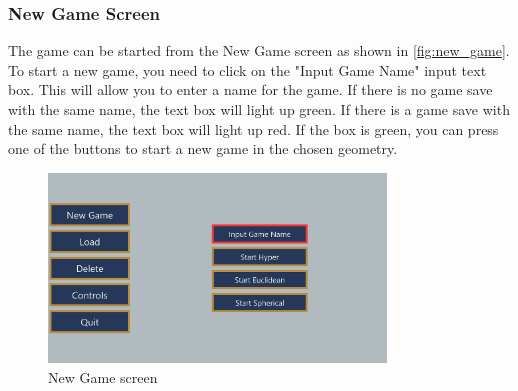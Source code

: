 \subsubsection{New Game Screen}
The game can be started from the New Game screen as shown in \autoref{fig:new_game}.
To start a new game, you need to click on the "Input Game Name" input text box.
This will allow you to enter a name for the game.
If there is no game save with the same name, the text box will light up green.
If there is a game save with the same name, the text box will light up red.
If the box is green, you can press one of the buttons to start a new game in the chosen geometry.

\begin{figure}[H]
    \centering
    \includegraphics[width=0.8\textwidth]{chapters/user_manual/resources/new-game-no-input.png}
    \caption{New Game screen}
    \label{fig:new_game}
\end{figure}